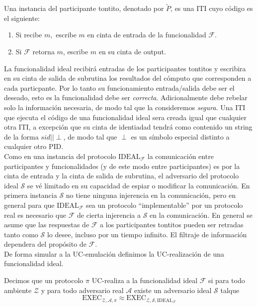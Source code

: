 \begin{definicion}
Una instancia del participante tontito, denotado por $\tilde P$, es una ITI cuyo código es el siguiente:
\begin{enumerate}
    \item Si recibe $m,$ escribe $m$ en cinta de entrada de la funcionalidad $\mathcal{F}$.
    \item Si $\mathcal{F}$ retorna $m$, escribe $m$ en su cinta de output. 
\end{enumerate}
\end{definicion}

La funcionalidad ideal recibirá entradas de los participantes tontitos y escribira en su cinta de salida de
subrutina los resultados del cómputo que corresponden a cada particpante. Por lo tanto su funcionamiento
entrada/salida debe ser el deseado, esto es la funcionalidad debe ser \textit{correcta}. Adicionalmente
debe rebelar solo la información necesaria, de modo tal que la consideremos \textit{segura}. Una ITI
que ejecuta el código de una funcionalidad ideal sera creada igual que cualquier otra ITI, a excepción
que su cinta de identiadad tendrá como contenido un string de la forma $sid||\perp$, de modo tal que $\perp$
es un símbolo especial distinto a cualquier otro PID.\\
Como en una instancia del protocolo $\mathrm{IDEAL}_\mathcal{F}$ la comunicación entre participantes y
funcionalidades (y de este modo entre participantes) es por la cinta de entrada y la cinta de salida
de subrutina, el adversario del protocolo ideal $\mathcal{S}$ se vé límitado en su capacidad de
espiar o modificar la comunicación. En primera instancia $\mathcal{S}$  no tiene ninguna injerencia en
la comunicación, pero en general para que $\mathrm{IDEAL}_\mathcal{F}$ sea un protocolo ``implementable''
por un protocolo real es necesario que $\mathcal{F}$ de cierta injerencia a $\mathcal{S}$ en la comunicación.
En general se asume que las respuestas de $\mathcal{F}$ a los participantes tontitos pueden ser retradas tanto
como $\mathcal{S}$ lo desee, incluso por un tiempo infinito. El filtraje de información dependera del propósito
de $\mathcal{F}$.\\
De forma simular a la UC-emulación definimos la UC-realización de una funcionalidad ideal.

\begin{definicion}[UC-realización]
Decimos que un protocolo $\pi$ UC-realiza a la funcionalidad ideal $\mathcal{F}$ si para todo ambiente
$\mathcal{Z}$ y para todo adversario real $\mathcal{A}$ existe un adversario ideal $\mathcal{S}$ talque
$$
\mathrm{EXEC}_{
    \mathcal{Z},
    \mathcal{A},
    \pi}
\approx
\mathrm{EXEC}_{
    \mathcal{Z},
    \mathcal{S},
    \mathrm{IDEAL}_\mathcal{F}}
$$
\end{definicion}

